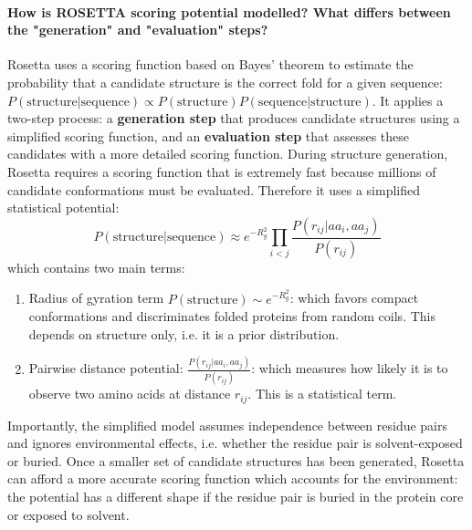 \paragraph{How is ROSETTA scoring potential modelled? What differs between the "generation" and "evaluation" steps?}
Rosetta uses a scoring function based on Bayes' theorem to estimate the probability that a candidate structure is the correct fold for a given sequence:
$P(\text{structure}|\text{sequence}) \propto P(\text{structure})P(\text{sequence}|\text{structure})$.
It applies a two-step process: a \textbf{generation step} that produces candidate structures using a simplified scoring function, and an \textbf{evaluation step} that assesses these candidates with a more detailed scoring function.
During structure generation, Rosetta requires a scoring function that is extremely fast because millions of candidate conformations must be evaluated. Therefore it uses a simplified statistical potential:
\[
P(\text{structure}|\text{sequence})
\approx
e^{-R_g^2}
\prod_{i<j}
\frac{P(r_{ij}|aa_i,aa_j)}
     {P(r_{ij})}
\]
which contains two main terms:
\begin{enumerate}
    \item Radius of gyration term $P(\text{structure}) \sim e^{-R_g^2}$: which favors compact conformations and discriminates folded proteins from random coils. This depends on structure only, i.e. it is a prior distribution.
    \item Pairwise distance potential: $\frac{P(r_{ij}|aa_i,aa_j)} {P(r_{ij})}$:  which measures how likely it is to observe two amino acids at distance \(r_{ij}\). This is a statistical term.
\end{enumerate}
\smallskip \noindent Importantly, the simplified model assumes independence between residue pairs and ignores environmental effects, i.e. whether the residue pair is solvent-exposed or buried.
Once a smaller set of candidate structures has been generated, Rosetta can afford a more accurate scoring function which accounts for the environment:
the potential has a different shape if the residue pair is buried in the protein core or exposed to solvent. 


